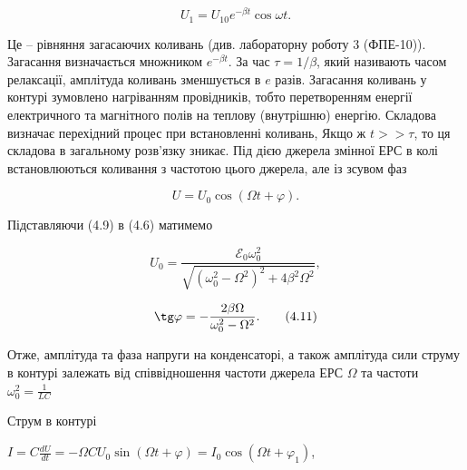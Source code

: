 \documentclass[12pt,a4paper]{article}
\begin{document}
    \begin{equation}
        U_1 = U_{10} e^{-\beta t} \cos \omega t.
        \tag{4.8}
    \end{equation}

    \vspace{0.5em}

    Це – рівняння загасаючих коливань
    (див. лабораторну роботу 3 (ФПЕ-10)).
    Загасання визначається множником $e^{-\beta t}$.
    За час $\tau = 1/\beta$, який називають часом релаксації,
    амплітуда коливань зменшується в $e$ разів.
    Загасання коливань у контурі зумовлено нагріванням провідників,
    тобто перетворенням енергії електричного та магнітного полів
    на теплову (внутрішню) енергію.
    Складова визначає перехідний процес при встановленні коливань,
    Якщо ж $t >> \tau$, то ця складова в загальному розв’язку зникає.
    Під дією джерела змінної ЕРС в колі встановлюються коливання
    з частотою цього джерела, але із зсувом фаз

    \vspace{0.5em}

    \begin{equation}
        U = U_0 \cos (\Omega t + \varphi).
        \tag{4.9}
    \end{equation}

    \vspace{0.5em}

    Підставляючи (4.9) в (4.6) матимемо

    \begin{equation}
        U_0 = \frac{\mathcal{E}_0 \omega_0^2}{\sqrt{\left(\omega_0^2 - \Omega^2 \right)^2 + 4\beta^2\Omega^2}},
        \tag{4.10}
    \end{equation}

    \begin{equation}
        \tg \varphi = -\frac{2\beta \Omega}{\omega_0^2 - \Omega^2}.
        \tag{4.11}
    \end{equation}

    \vspace{0.5em}

    Отже, амплітуда та фаза напруги на конденсаторі,
    а також амплітуда сили струму в контурі залежать
    від співвідношення частоти джерела ЕРС $\Omega$ та частоти
    $\displaystyle \omega_0^2 = \frac{1}{LC}$

    Струм в контурі

    \vspace{0.5em}

    \begin{center}
        $\displaystyle I = C\frac{dU}{dt} = -\Omega C U_0 \sin(\Omega t + \varphi) = I_0 \cos(\Omega t + \varphi_1)$,
    \end{center}
\end{document}
